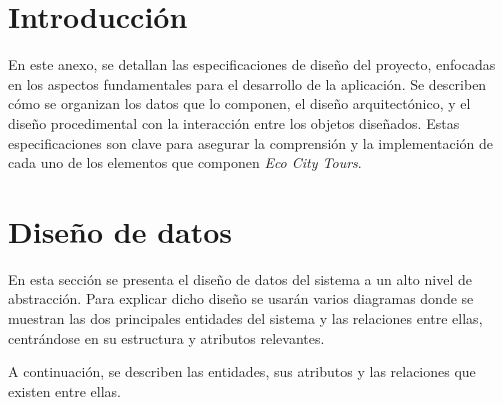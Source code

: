 
\section{Introducción}
En este anexo, se detallan las especificaciones de diseño del proyecto, enfocadas en los aspectos fundamentales para el desarrollo de la aplicación. Se describen cómo se organizan los datos que lo componen, el diseño arquitectónico, y el diseño procedimental con la interacción entre los objetos diseñados. Estas especificaciones son clave para asegurar la comprensión y la implementación de cada uno de los elementos que componen \textit{Eco City Tours}.
\section{Diseño de datos}

En esta sección se presenta el diseño de datos del sistema a un alto nivel de abstracción. Para explicar dicho diseño se usarán varios diagramas donde se muestran las dos principales entidades del sistema y las relaciones entre ellas, centrándose en su estructura y atributos relevantes. 

A continuación, se describen las entidades, sus atributos y las relaciones que existen entre ellas.
